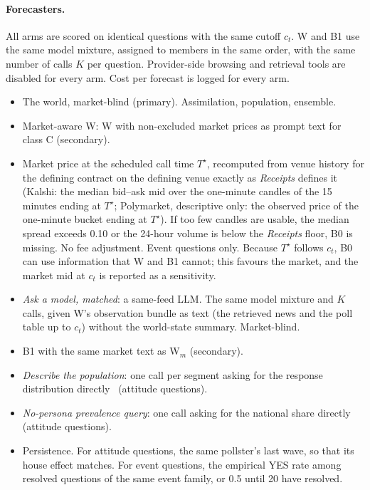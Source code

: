\documentclass[11pt]{article}
\begin{document}
\paragraph{Forecasters.} All arms are scored on identical questions with the same cutoff $c_t$. W and B1 use the same model mixture, assigned to members in the same order, with the same number of calls $K$ per question. Provider-side browsing and retrieval tools are disabled for every arm. Cost per forecast is logged for every arm.
\begin{itemize}
  \item[\textbf{W}] The world, market-blind (primary). Assimilation, population, ensemble.
  \item[\textbf{W$_m$}] Market-aware W: W with non-excluded market prices as prompt text for class C (secondary).
  \item[\textbf{B0}] Market price at the scheduled call time $T^\star$, recomputed from venue history for the defining contract on the defining venue exactly as \emph{Receipts} defines it (Kalshi: the median bid--ask mid over the one-minute candles of the 15 minutes ending at $T^\star$; Polymarket, descriptive only: the observed price of the one-minute bucket ending at $T^\star$). If too few candles are usable, the median spread exceeds 0.10 or the 24-hour volume is below the \emph{Receipts} floor, B0 is missing. No fee adjustment. Event questions only. Because $T^\star$ follows $c_t$, B0 can use information that W and B1 cannot; this favours the market, and the market mid at $c_t$ is reported as a sensitivity.
  \item[\textbf{B1}] \emph{Ask a model, matched}: a same-feed LLM. The same model mixture and $K$ calls, given W's observation bundle as text (the retrieved news and the poll table up to $c_t$) without the world-state summary. Market-blind.
  \item[\textbf{B1$_m$}] B1 with the same market text as W$_m$ (secondary).
  \item[\textbf{B2}] \emph{Describe the population}: one call per segment asking for the response distribution directly~\citep{jang2026instruction} (attitude questions).
  \item[\textbf{B2$_q$}] \emph{No-persona prevalence query}: one call asking for the national share directly~\citep{doudkin2026marginal} (attitude questions).
  \item[\textbf{B3}] Persistence. For attitude questions, the same pollster's last wave, so that its house effect matches. For event questions, the empirical YES rate among resolved questions of the same event family, or 0.5 until 20 have resolved.

\end{itemize}
\end{document}

